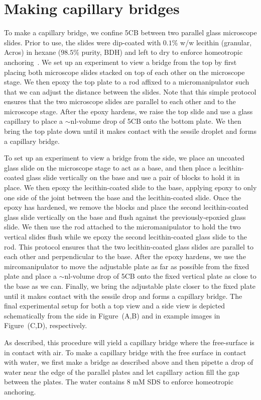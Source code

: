 \section{Making capillary bridges}
To make a capillary bridge, we confine 5CB between two parallel glass microscope slides.
Prior to use, the slides were dip-coated with $0.1\%$ w/w lecithin (granular, Acros) in hexane ($98.5\%$ purity, BDH) and left to dry to enforce homeotropic anchoring~\cite{RN140}.
We set up an experiment to view a bridge from the top by first placing both microscope slides stacked on top of each other on the microscope stage.
We then epoxy the top plate to a rod affixed to a micromanipulator such that we can adjust the distance between the slides.
Note that this simple protocol ensures that the two microscope slides are parallel to each other and to the microscope stage.
After the epoxy hardens, we raise the top slide and use a glass capillary to place a $\sim$nl-volume drop of 5CB onto the bottom plate.
We then bring the top plate down until it makes contact with the sessile droplet and forms a capillary bridge.

To set up an experiment to view a bridge from the side, we place an uncoated glass slide on the microscope stage to act as a base, and then place a lecithin-coated glass slide vertically on the base and use a pair of blocks to hold it in place.
We then epoxy the lecithin-coated slide to the base, applying epoxy to only one side of the joint between the base and the lecithin-coated slide.
Once the epoxy has hardened, we remove the blocks and place the second lecithin-coated glass slide vertically on the base and flush against the previously-epoxied glass slide.
We then use the rod attached to the micromanipulator to hold the two vertical slides flush while we epoxy the second lecithin-coated glass slide to the rod.
This protocol ensures that the two lecithin-coated glass slides are parallel to each other and perpendicular to the base.
After the epoxy hardens, we use the mircomanipulator to move the adjustable plate as far as possible from the fixed plate and place a $\sim$nl-volume drop of 5CB onto the fixed vertical plate as close to the base as we can.
Finally, we bring the adjustable plate closer to the fixed plate until it makes contact with the sessile drop and forms a capillary bridge.
The final experimental setup for both a top view and a side view is depicted schematically from the side in Figure~(A,B) and in example images in Figure~(C,D), respectively.

As described, this procedure will yield a capillary bridge where the free-surface is in contact with air.
To make a capillary bridge with the free surface in contact with water, we first make a bridge as described above and then pipette a drop of water near the edge of the parallel plates and let capillary action fill the gap between the plates.
The water contains 8 mM SDS to enforce homeotropic anchoring.




